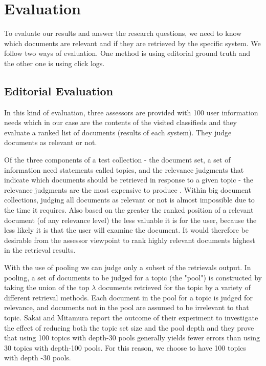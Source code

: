 \section{Evaluation}

To evaluate our results and answer the research questions, we need to know which documents are relevant and if they are retrieved by the specific system. We follow two ways of evaluation. One method is using editorial ground truth and the other one is using click logs.

\subsection{Editorial Evaluation}

In this kind of evaluation, three assessors are provided with 100 user information needs which in our case are the contents of the visited classifieds and they evaluate a ranked list of documents (results of each system). They judge documents as relevant or not.

Of the three components of a test collection - the document set, a set of information need statements called topics, and the relevance judgments that indicate which documents should be retrieved in response to a given topic - the relevance judgments are the most expensive to produce \cite{BuckleyDimmick}. Within big document collections, judging all documents as relevant or not is  almost impossible due to the time it requires. Also based on \cite{KalervoKekalainen} the greater the ranked position of a relevant document (of any relevance level) the less valuable it is for the user, because the less likely it is that the user will examine the document. It would therefore be desirable from the assessor viewpoint to rank highly relevant documents highest in the retrieval results.

With the use of pooling we can judge only a subset of the retrievals output. In pooling, a set of documents to be judged for a topic (the "pool") is constructed by taking the union of the top $\lambda$ documents retrieved for the topic by a variety of different retrieval methods. Each document in the pool for a topic is judged for relevance, and documents not in the pool are assumed to be irrelevant to that topic.
Sakai and Mitamura \cite{SakaiMitamura} report the outcome of their experiment to investigate the effect of reducing both the topic set size and the pool depth and they prove that using 100 topics with depth-30 pools generally yields fewer errors than using 30 topics with depth-100 pools. For this reason, we choose to have 100 topics with depth -30 pools.


